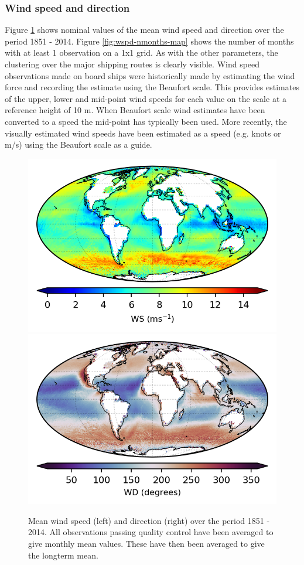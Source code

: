 \subsubsection{Wind speed and direction}
Figure \ref{fig:wspd-map} shows nominal values of the mean wind speed and direction over the period 1851 - 2014. 
Figure \ref{fig:wspd-nmonths-map} shows the number of months with at least 1 observation on a 1x1 grid. 
As with the other parameters, the clustering over the major shipping routes is clearly visible. 
Wind speed observations made on board ships were historically made by estimating the wind force and recording the estimate using the Beaufort scale. 
This provides estimates of the upper, lower and mid-point wind speeds for each value on the scale at a reference height of 10 m. 
When Beaufort scale wind estimates have been converted to a speed the mid-point has typically been used. 
More recently, the visually estimated wind speeds have been estimated as a speed (e.g. knots or m/s) using the Beaufort scale as a guide. 

\begin{figure}[h]
    \includegraphics{resources/observations-ws-mean-map-optimal.png}
    \includegraphics{resources/observations-wd-mean-map-optimal.png}
    \caption{Mean wind speed (left) and direction (right) over the period 1851 - 2014. All observations passing quality control have been averaged to give monthly mean values. These have then been averaged to give the longterm mean.}
    \label{fig:wspd-map}
\end{figure}

